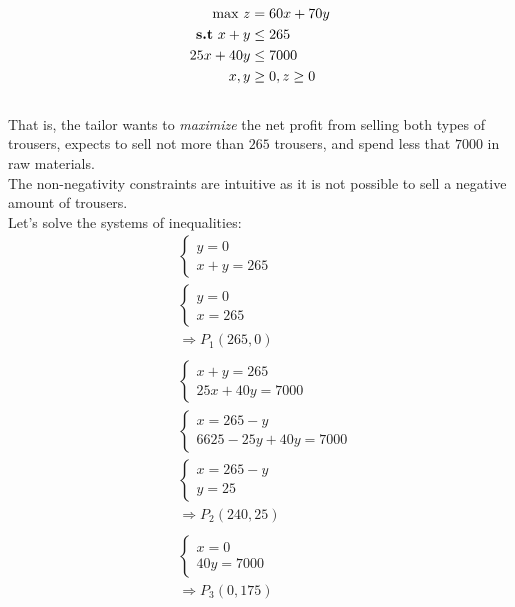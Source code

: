 \documentclass[unicode,11pt,a4paper,oneside,numbers=endperiod,openany]{scrartcl}
\begin{document}
\begin{equation*}
    \begin{split}
    \text{max  } z & = 60x+70y \\
     \text{\textbf{s.t}  } x+y&\leq 265\\
     25x+40y&\leq 7000 \\
     x,y &\geq 0, z\geq 0
    \end{split}
\end{equation*}\\
That is, the tailor wants to \textit{maximize} the net profit from selling both types of trousers, expects to sell not more than $265$ trousers, and spend less that $7000$ in raw materials.\\
The non-negativity constraints are intuitive as it is not possible to sell a negative amount of trousers.\\
Let's solve the systems of inequalities:\\
\begin{align*}
    & \begin{cases}
        y=0\\
        x+y=265
    \end{cases}\\
    &\begin{cases}
        y=0\\
        x=265
    \end{cases}\\
    &\Rightarrow P_1(265, 0) \\\\
    & \begin{cases}
        x+y=265\\
        25x+40y=7000
    \end{cases}\\
    &\begin{cases}
        x=265-y\\
        6625-25y+40y=7000
    \end{cases}\\
    &\begin{cases}
        x=265-y\\
        y=25
    \end{cases}\\
    &\Rightarrow P_2(240, 25)\\\\
    & \begin{cases}
        x=0\\
        40y=7000
    \end{cases}\\
    &\Rightarrow P_3(0, 175)
\end{align*}\\
\end{document}
